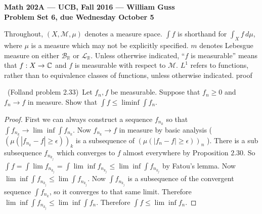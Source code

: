 \documentclass[11pt]{amsart}
\theoremstyle{definition}
\numberwithin{theorem}{section}
\numberwithin{definition}{section}
\numberwithin{equation}{section}
\def\reals{{\mathbb R}}
\def\complex{{\mathbb C}\/}
\def\scriptm{{\mathcal M}}
\def\scriptb{{\mathcal B}}
\def\scriptl{{\mathcal L}}
\begin{document}
\begin{center}{\bf Math 202A --- UCB, Fall 2016 --- William Guss}
\\
{\bf Problem Set 6, due Wednesday October 5}
\end{center}

\medskip
Throughout, $(X,\scriptm,\mu)$ denotes a measure space. 
$\int f$ is shorthand for $\int_X f\,d\mu$, where $\mu$ is a measure which
may not be explicitly specified. $m$ denotes Lebesgue measure on either $\scriptb_\reals$
or $\scriptl_\reals$. Unless otherwise indicated, ``$f$ is measurable'' means
that $f:X\to\complex$ and $f$ is measurable with respect to $\scriptm$.
$L^1$ refers to functions, rather than to equivalence classes of functions, unless
otherwise indicated.
proof

\medskip {}\ (Folland problem 2.33)\ 
Let $f_n,f$ be measurable.
Suppose that $f_n\ge 0$ and $f_n\to f$ in measure. 
Show that $\int f\le \liminf \int f_n$.

\begin{proof}
	First we can always construct a sequence $f_{n_k}$ so that $\int f_{n_k} \to \lim\inf \int f_{n_k}.$ Now $f_{n_k} \to f$ in measure by basic analysis ($(\mu(|f_{n_k} - f| \geq \epsilon))_k$ is a subsequence of $(\mu(|f_{n} - f| \geq \epsilon))_n$ ). 
	There is a sub subsequence $f_{n_{k_j}}$ which converges to $f$ almost everywhere by Proposition $2.30$.  
	So $\int f = \int \lim f_{n_{k_j}} = \int \lim \inf f_{n_{k_j}}  \leq \lim \inf \int {f_{n_{k_{j}}}}$ by Fatou's lemma.
	  Now $\lim \inf \int f_{n_{k_j}} \leq \lim \int f_{n_{k_j}}$. Now $\int f_{n_{k_j}}$ is a subsequence of the convergent sequence $\int f_{n_k}$, so it converges to that same limit. Therefore $\lim \inf \int {f_{n_{k_{j}}}} \leq \lim \inf \int f_n.$ Therefore $\int f \leq \lim \inf f_n$.
\end{proof}
\end{document}
